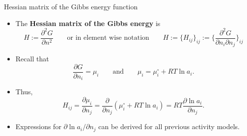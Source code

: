 %
\begin{frame}{Hessian matrix of the Gibbs energy function}
\begin{itemize}
\item The \alert{\bf Hessian matrix of the Gibbs energy} is
\[
H :=\frac{\partial^{2}G}{\partial n^{2}} 
\qquad\text{or in element wise notation}\qquad 
H :=\big\{ H_{ij} \big\}_{ij} 
:= \Bigg\{ \frac{\partial^{2}G}{\partial n_{i}\partial n_{j}}\Bigg\}_{ij} 
\]
\item Recall that
\[
\frac{\partial G}{\partial n_{i}}=\mu_{i}\qquad\text{and}\qquad\mu_{i}=\mu_{i}^{\circ}+RT\ln a_{i}.
\]
\item Thus, 
\[
H_{ij}=\frac{\partial\mu_{i}}{\partial n_{j}}=\frac{\partial}{\partial n_{j}}\left(\mu_{i}^{\circ}+RT\ln a_{i}\right)=RT\frac{\partial\ln a_{i}}{\partial n_{j}}.
\]
\item Expressions for $\partial\ln a_{i}/\partial n_{j}$ can be derived
for all previous activity models.
\end{itemize}
\end{frame}
%
